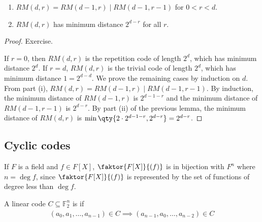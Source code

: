 \begin{theorem}
    \begin{enumerate}
        \item $RM(d,r) = RM(d-1,r) \mid RM(d-1,r-1)$ for $0 < r < d$.
        \item $RM(d,r)$ has minimum distance $2^{d-r}$ for all $r$.
    \end{enumerate}
\end{theorem}

\begin{proof}
    Exercise.

    If $r = 0$, then $RM(d,r)$ is the repetition code of length $2^d$, which has minimum distance $2^d$.
    If $r = d$, $RM(d,r)$ is the trivial code of length $2^d$, which has minimum distance $1 = 2^{d-d}$.
    We prove the remaining cases by induction on $d$.
    From part (i), $RM(d,r) = RM(d-1,r) \mid RM(d-1,r-1)$.
    By induction, the minimum distance of $RM(d-1,r)$ is $2^{d-1-r}$ and the minimum distance of $RM(d-1,r-1)$ is $2^{d-r}$.
    By part (ii) of the previous lemma, the minimum distance of $RM(d,r)$ is $\min\qty{2\cdot 2^{d-1-r}, 2^{d-r}} = 2^{d-r}$.
\end{proof}

\subsection{Cyclic codes}
If $F$ is a field and $f \in F[X]$, $\faktor{F[X]}{(f)}$ is in bijection with $F^n$ where $n = \deg f$, since $\faktor{F[X]}{(f)}$ is represented by the set of functions of degree less than $\deg f$.

\begin{definition}
    A linear code $C \subseteq \mathbb F_2^n$ is  if
    \begin{align*}
        (a_0, a_1, \dots, a_{n-1}) \in C \implies (a_{n-1}, a_0, \dots, a_{n-2}) \in C
    \end{align*}
\end{definition}

